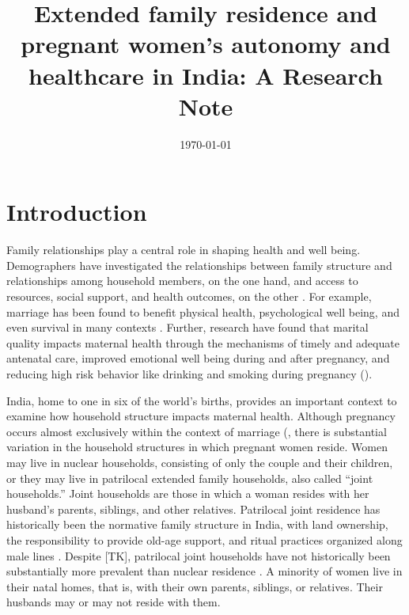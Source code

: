 \documentclass[12pt]{article}
\begin{document}
\title{Extended family residence and pregnant women's autonomy and healthcare in India: A Research Note}

\date{\today}


\section{Introduction}

Family relationships play a central role in shaping health and well being. Demographers have investigated the relationships between family structure and relationships among household members, on the one hand, and access to resources, social support, and health outcomes, on the other \citep{lindemann2019family, waite2000family, umberson2010social}. For example, marriage has been found to benefit physical health, psychological well being, and even survival in many contexts \citep{ross1990impact, begashaw2016health, lewis2004conceptualization, soulsby2015marriage, robles2014marital}. Further, research have found that marital quality impacts maternal health through the mechanisms of timely and adequate antenatal care, improved emotional well being during and after pregnancy, and reducing high risk behavior like drinking and smoking during pregnancy (\cite{alipour2019relationship,rosand2011partner}).

India, home to one in six of the world’s births, provides an important context to examine how household structure impacts maternal health.  Although pregnancy occurs almost exclusively within the context of marriage (\citep{banerji2021does}, there is substantial variation in the household structures in which pregnant women reside. Women may live in nuclear households, consisting of only the couple and their children, or they may live in patrilocal extended family households, also called ``joint households.''  Joint households are those in which a woman resides with her husband’s parents, siblings, and other relatives.  Patrilocal joint residence has historically been the normative family structure in India, with land ownership, the responsibility to provide old-age support, and ritual practices organized along male lines \cite{jayachandran2015roots}.  Despite [TK], patrilocal joint households have not historically been substantially more prevalent than nuclear residence \citep{breton2021modernisation}.  A minority of women live in their natal homes, that is, with their own parents, siblings, or relatives.  Their husbands may or may not reside with them.
\end{document}
